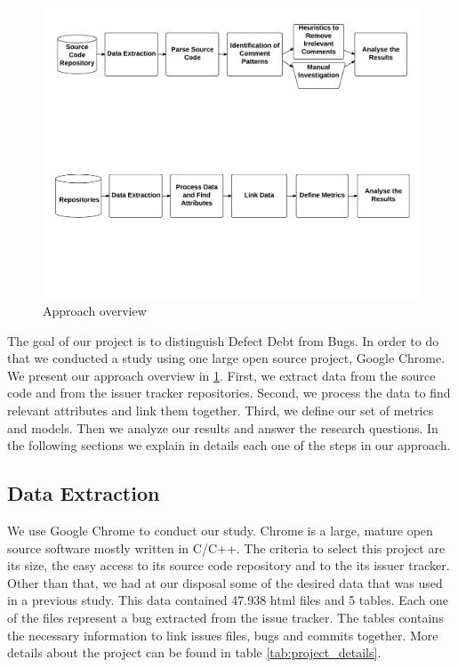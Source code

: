 \begin{figure}[thb!]
  \caption{Approach overview}
  \centering
  \label{fig:approach}
  \includegraphics[width=1\textwidth]{figures/approach}
\end{figure}

The goal of our project is to distinguish Defect Debt from Bugs. In order to do that we conducted a study using one large open source project, Google Chrome. We present our approach overview in \ref{fig:approach}. First, we extract data from the source code and from the issuer tracker repositories. Second,  we process the data to find relevant attributes and link them together. Third, we define our set of metrics and models. Then we analyze our results and answer the research questions. In the following sections we explain in details each one of the steps in our approach.   

\subsection{Data Extraction}

We use Google Chrome to conduct our study. Chrome is a large, mature open source software mostly written in C/C++. The criteria to select this project are its size, the easy access to its source code repository and to the its issuer tracker. Other than that, we had at our disposal some of the desired data that was used in a previous study. This data contained 47.938 html files and 5 tables. Each one of the files represent a bug extracted from the issue tracker. The tables contains the necessary information to link issues files, bugs and commits together. More details about the project can be found in table \ref{tab:project_details}.

